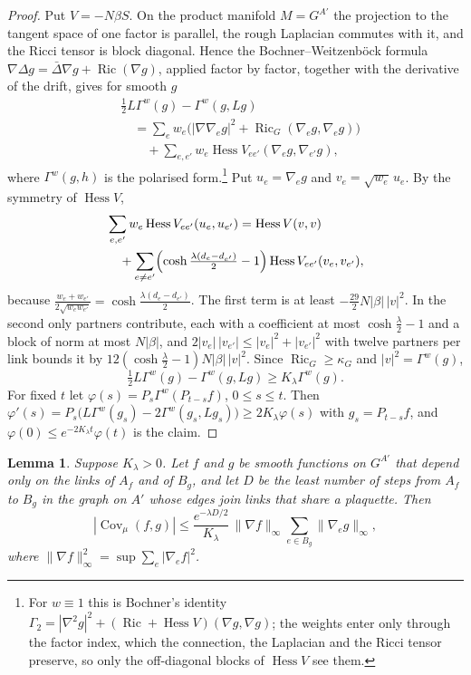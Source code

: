 \documentclass[aps,prd,twocolumn,superscriptaddress,nofootinbib,longbibliography,floatfix,amsmath,amssymb,10pt]{revtex4-2}
\newtheorem{lemma}[theorem]{Lemma}
\theoremstyle{definition}
\theoremstyle{remark}
\newcommand{\Hess}{\operatorname{Hess}}
\newcommand{\Ric}{\operatorname{Ric}}
\newcommand{\Cov}{\operatorname{Cov}}
\begin{document}
\begin{proof}
Put $V=-N\beta S$. On the product manifold $M=G^{A'}$ the projection to the
tangent space of one factor is parallel, the rough Laplacian commutes with
it, and the Ricci tensor is block diagonal. Hence the Bochner--Weitzenb\"ock
formula $\nabla\Delta g=\bar\Delta\nabla g+\Ric(\nabla g)$, applied factor by
factor, together with the derivative of the drift, gives for smooth $g$
\[
\begin{split}
&\tfrac12L\Gamma^w(g)-\Gamma^w(g,Lg)\\
&\quad=\sum_ew_e\bigl(|\nabla\nabla_eg|^2+\Ric_G(\nabla_eg,\nabla_eg)\bigr)\\
&\qquad+\sum_{e,e'}w_e\Hess V_{ee'}(\nabla_eg,\nabla_{e'}g),
\end{split}
\]
where $\Gamma^w(g,h)$ is the polarised form.\footnote{For $w\equiv1$ this is
Bochner's identity $\Gamma_2=|\nabla^2g|^2+(\Ric+\Hess V)(\nabla g,\nabla g)$;
the weights enter only through the factor index, which the connection, the
Laplacian and the Ricci tensor preserve, so only the off-diagonal blocks of
$\Hess V$ see them.} Put $u_e=\nabla_eg$ and $v_e=\sqrt{w_e}\,u_e$. By the
symmetry of $\Hess V$,
\[
\begin{split}
&\sum_{e,e'}w_e\Hess V_{ee'}(u_e,u_{e'})=\Hess V(v,v)\\
&\quad+\sum_{e\ne e'}\Bigl(\cosh\tfrac{\lambda(d_e-d_{e'})}2-1\Bigr)
\Hess V_{ee'}(v_e,v_{e'}),
\end{split}
\]
because $\frac{w_e+w_{e'}}{2\sqrt{w_ew_{e'}}}=\cosh\frac{\lambda(d_e-d_{e'})}2$. The
first term is at least $-\frac{29}2N|\beta|\,|v|^2$. In the second only
partners contribute, each with a coefficient at most $\cosh\frac\lambda2-1$
and a block of norm at most $N|\beta|$, and
$2|v_e|\,|v_{e'}|\le|v_e|^2+|v_{e'}|^2$ with twelve partners per link bounds it by
$12(\cosh\frac\lambda2-1)N|\beta|\,|v|^2$. Since $\Ric_G\ge\kappa_G$ and
$|v|^2=\Gamma^w(g)$,
\[
\tfrac12L\Gamma^w(g)-\Gamma^w(g,Lg)\ge K_\lambda\Gamma^w(g).
\]
For fixed $t$ let $\varphi(s)=P_s\Gamma^w(P_{t-s}f)$, $0\le s\le t$. Then
$\varphi'(s)=P_s\bigl(L\Gamma^w(g_s)-2\Gamma^w(g_s,Lg_s)\bigr)\ge2K_\lambda\varphi(s)$
with $g_s=P_{t-s}f$, and $\varphi(0)\le e^{-2K_\lambda t}\varphi(t)$ is the claim.
\end{proof}

\begin{lemma}\label{lem:decayrate}
Suppose $K_\lambda>0$. Let $f$ and $g$ be smooth functions on $G^{A'}$ that
depend only on the links of $A_f$ and of $B_g$, and let $D$ be the least
number of steps from $A_f$ to $B_g$ in the graph on $A'$ whose edges join
links that share a plaquette. Then
\[
|\Cov_\mu(f,g)|\le\frac{e^{-\lambda D/2}}{K_\lambda}\,\|\nabla f\|_\infty
\sum_{e\in B_g}\|\nabla_eg\|_\infty ,
\]
where $\|\nabla f\|_\infty^2=\sup\sum_e|\nabla_ef|^2$.
\end{lemma}
\end{document}
